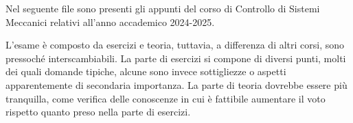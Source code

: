 \intro
Nel seguente file sono presenti gli appunti del corso di Controllo di Sistemi Meccanici relativi all'anno accademico 2024-2025.

L'esame è composto da esercizi e teoria, tuttavia, a differenza di altri corsi, sono pressoché interscambiabili.
La parte di esercizi si compone di diversi punti, molti dei quali domande tipiche, alcune sono invece sottigliezze o aspetti apparentemente di secondaria importanza.
La parte di teoria dovrebbe essere più tranquilla, come verifica delle conoscenze in cui è fattibile aumentare il voto rispetto quanto preso nella parte di esercizi.